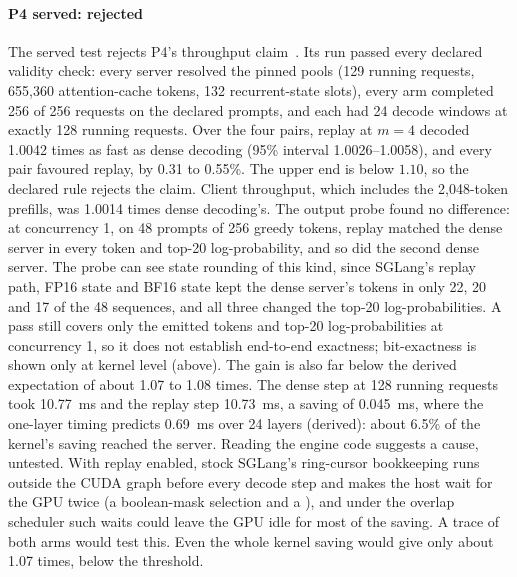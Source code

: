 \paragraph{P4 served: rejected} The served test rejects P4's throughput claim~. Its run passed every declared validity check: every server resolved the pinned pools (129 running requests, 655,360 attention-cache tokens, 132 recurrent-state slots), every arm completed 256 of 256 requests on the declared prompts, and each had 24 decode windows at exactly 128 running requests. Over the four pairs, replay at $m=4$ decoded 1.0042 times as fast as dense decoding (95\% interval 1.0026--1.0058), and every pair favoured replay, by 0.31 to 0.55\%. The upper end is below $1.10$, so the declared rule rejects the claim. Client throughput, which includes the 2,048-token prefills, was 1.0014 times dense decoding's. The output probe found no difference: at concurrency 1, on 48 prompts of 256 greedy tokens, replay matched the dense server in every token and top-20 log-probability, and so did the second dense server. The probe can see state rounding of this kind, since SGLang's replay path, FP16 state and BF16 state kept the dense server's tokens in only 22, 20 and 17 of the 48 sequences, and all three changed the top-20 log-probabilities. A pass still covers only the emitted tokens and top-20 log-probabilities at concurrency 1, so it does not establish end-to-end exactness; bit-exactness is shown only at kernel level (above). The gain is also far below the derived expectation of about 1.07 to 1.08 times. The dense step at 128 running requests took 10.77~ms and the replay step 10.73~ms, a saving of 0.045~ms, where the one-layer timing predicts 0.69~ms over 24 layers (derived): about 6.5\% of the kernel's saving reached the server. Reading the engine code suggests a cause, untested. With replay enabled, stock SGLang's ring-cursor bookkeeping runs outside the CUDA graph before every decode step and makes the host wait for the GPU twice (a boolean-mask selection and a ), and under the overlap scheduler such waits could leave the GPU idle for most of the saving. A trace of both arms would test this. Even the whole kernel saving would give only about 1.07 times, below the threshold.

